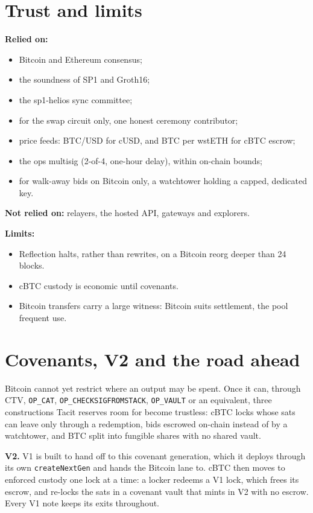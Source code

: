 \documentclass[11pt,letterpaper]{article}
\newcommand{\op}[1]{\texttt{#1}}
\begin{document}
\section{Trust and limits}

\textbf{Relied on:}

\begin{itemize}
\item Bitcoin and Ethereum consensus;
\item the soundness of SP1 and Groth16;
\item the sp1-helios sync committee;
\item for the swap circuit only, one honest ceremony contributor;
\item price feeds: BTC/USD for cUSD, and BTC per wstETH for cBTC escrow;
\item the ops multisig (2-of-4, one-hour delay), within on-chain bounds;
\item for walk-away bids on Bitcoin only, a watchtower holding a capped, dedicated key.
\end{itemize}

\textbf{Not relied on:} relayers, the hosted API, gateways and explorers.

\textbf{Limits:}

\begin{itemize}
\item Reflection halts, rather than rewrites, on a Bitcoin reorg deeper than 24 blocks.
\item cBTC custody is economic until covenants.
\item Bitcoin transfers carry a large witness: Bitcoin suits settlement, the pool frequent use.
\end{itemize}

\section{Covenants, V2 and the road ahead}

Bitcoin cannot yet restrict where an output may be spent. Once it can, through CTV, \op{OP\_CAT}, \op{OP\_CHECKSIGFROMSTACK}, \op{OP\_VAULT} or an equivalent, three
constructions Tacit reserves room for become trustless: cBTC locks whose sats can leave only through a
redemption, bids escrowed on-chain instead of by a watchtower, and BTC split into fungible shares with no
shared vault.

\textbf{V2.} V1 is built to hand off to this covenant generation, which it deploys through its own
\op{createNextGen} and hands the Bitcoin lane to. cBTC then moves to enforced custody one lock at a time: a
locker redeems a V1 lock, which frees its escrow, and re-locks the sats in a covenant vault that mints in
V2 with no escrow. Every V1 note keeps its exits throughout.
\end{document}
